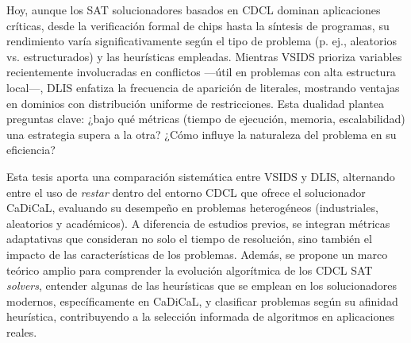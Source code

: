 






Hoy, aunque los SAT solucionadores basados en CDCL dominan aplicaciones críticas, desde la verificación formal de chips hasta la síntesis de programas, su rendimiento varía significativamente según el tipo de problema (p. ej., aleatorios vs. estructurados) y las heurísticas empleadas. Mientras VSIDS prioriza variables recientemente involucradas en conflictos —útil en problemas con alta estructura local—, DLIS enfatiza la frecuencia de aparición de literales, mostrando ventajas en dominios con distribución uniforme de restricciones. Esta dualidad plantea preguntas clave: ¿bajo qué métricas (tiempo de ejecución, memoria, escalabilidad) una estrategia supera a la otra? ¿Cómo influye la naturaleza del problema en su eficiencia?

Esta tesis aporta una comparación sistemática entre VSIDS y DLIS, alternando entre el uso de \textit{restar} dentro del entorno CDCL que ofrece el solucionador CaDiCaL, evaluando su desempeño en problemas heterogéneos (industriales, aleatorios y académicos). A diferencia de estudios previos, se integran métricas adaptativas que consideran no solo el tiempo de resolución, sino también el impacto de las caracter\'isticas de los problemas. Además, se propone un marco teórico amplio para comprender la evoluci\'on algor\'itmica de los CDCL SAT \textit{solvers}, entender algunas de las heur\'isticas que se emplean en los solucionadores modernos, espec\'ificamente en CaDiCaL, y clasificar problemas según su afinidad heurística, contribuyendo a la selección informada de algoritmos en aplicaciones reales.

